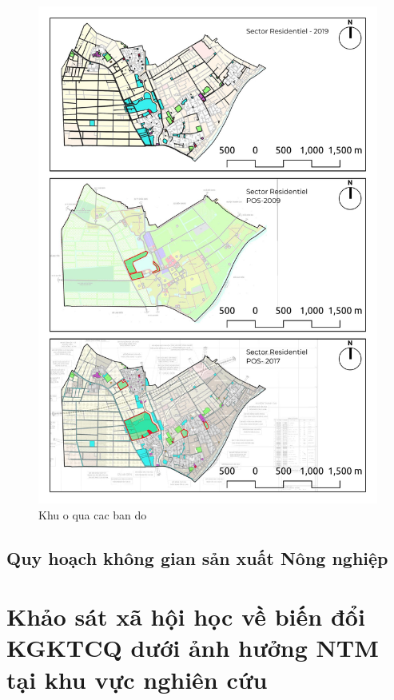 \documentclass[../thesis.tex]{subfiles}
\begin{document}
\begin{figure}
\includegraphics[width=15cm]{Graphic/TC6-QH-Xanh.jpg}
\caption{Khu o qua cac ban do}
\end{figure}
\clearpage

\subsection {Quy hoạch không gian sản xuất Nông nghiệp}
\section {Khảo sát xã hội học về biến đổi KGKTCQ dưới ảnh hưởng NTM tại khu vực nghiên cứu}
\end{document}
